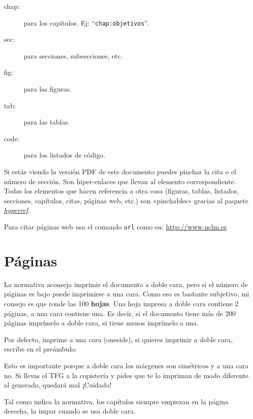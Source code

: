 \begin{description}
\item[chap:] para los capítulos. Ej: ``\texttt{chap:objetivos}''.
\item[sec:] para secciones, subsecciones, etc.
\item[fig:] para las figuras.
\item[tab:] para las tablas.
\item[code:] para los listados de código.
\end{description}

Si estás viendo la versión PDF de este documento puedes pinchar la cita o el número de
sección. Son hiper-enlaces que llevan al elemento correspondiente. Todos los elementos que
hacen referencia a otra cosa (figuras, tablas, listados, secciones, capítulos, citas,
páginas web, etc.) son «pinchables» gracias al paquete
\href{http://latex.tugraz.at/_media/docs/hyperref.pdf}{\emph{hyperref}}.

Para citar páginas web usa el comando \texttt{url} como en: \url{http://www.uclm.es}


\section{Páginas}
\label{sec:paginas}

La normativa aconseja imprimir el documento a doble cara, pero si el número de
páginas es bajo puede imprimirse a una cara. Como eso es bastante subjetivo, mi
consejo es que ronde las 100 \textbf{hojas}. Una hoja impresa a doble cara
contiene 2 páginas, a una cara contiene una. Es decir, si el documento tiene más
de 200 páginas imprímelo a doble cara, si tiene menos imprímelo a una.

Por defecto, \esitfg{} imprime a una cara (oneside), si quieres imprimir a doble cara,
escribe en el preámbulo:


Esto es importante porque a doble cara los márgenes son simétricos y a una cara
no. Si llevas el TFG a la copistería y pides que te lo impriman de modo
diferente al generado, quedará mal ¡Cuidado!

Tal como indica la normativa, los capítulos siempre empiezan en la página
derecha, la impar cuando se usa doble cara.



